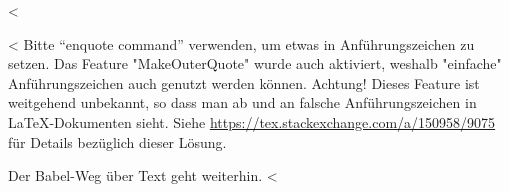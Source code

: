 <%

<%
Bitte \enquote{enquote command} verwenden, um etwas in Anführungszeichen zu setzen.
Das Feature "MakeOuterQuote" wurde auch aktiviert, weshalb "einfache" Anführungszeichen auch genutzt werden können.
Achtung! Dieses Feature ist weitgehend unbekannt, so dass man ab und an falsche Anführungszeichen in \LaTeX-Dokumenten sieht.
Siehe \url{https://tex.stackexchange.com/a/150958/9075} für Details bezüglich dieser Lösung.

Der Babel-Weg über \glqq{}Text\grqq{} geht weiterhin.
<%
